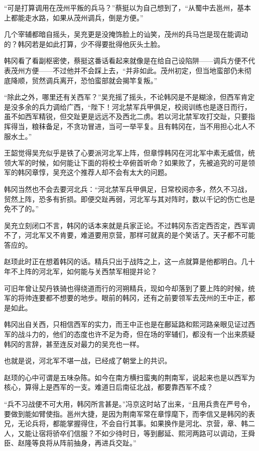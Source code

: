 “可是打算调用在茂州平叛的兵马？”蔡挺以为自己想到了，“从蜀中去邕州，基本上都能走水路，如果从茂州调兵，倒是方便。”

几个宰辅都暗自摇头，吴充更是没掩饰脸上的讪笑，茂州的兵马岂是现在能调动的？韩冈若是如此打算，少不得要批得他灰头土脸。

韩冈看了看副枢密使，蔡挺这番话看起来就像是在给自己设陷阱——调兵方便不代表茂州方便——不过他并不会踩上去，“并非如此。茂州初定，但当地蛮部仍未彻底降顺，贸然调兵离开，恐怕蛮部就会揭竿复叛。”

“除此之外，哪里还有关西军？”吴充摇了摇头，不论韩冈是不是糊涂，但西军肯定是没多余的兵力调给广西，“陛下！河北禁军兵甲俱足，校阅训练也是逐日而行，虽不如西军精锐，但交趾更是远远不及西北二虏。若以河北禁军攻打交趾，只要指挥得当，粮秣备足，不贪功冒进，当可一举平复。且有韩冈在，当不用担心北人不服水土。”

王韶觉得吴充似乎是铁了心要派河北军上阵，但章惇韩冈在河北军中素无威信，统领大军的时候，如何能让下面的将校士卒俯首听命？如果败了，先被追究的可是领军的韩冈章惇，吴充这个推荐人却不会有太大的问题。

韩冈当然也不会去要河北兵：“河北禁军兵甲俱足，日常校阅亦多，然久不习战，贸然上阵，恐多有折损。即便交趾再弱，河北军与其对阵时，数以千记的伤亡也是免不了的。”

吴充立刻闭口不言，韩冈的话本来就是兵家正论。不过韩冈东否定西否定，西军调不了，河北军又不肯要，难道要用京营，那样可就真的是个笑话了。天子都不可能答应的。

赵顼此时正在想着韩冈的话。精兵只出于战阵之上，这一点就算是他都明白。几十年不上阵的河北军，如何能与关西禁军相提并论？

可旧年曾让契丹铁骑也得绕道而行的河朔精兵，现如今却落到了要上阵的时候，统军的将帅连要都不想要的地步。眼前的韩冈，还有之前要领军去茂州的王中正，都是如此。

韩冈出自关西，只相信西军的实力，而王中正也是在鄜延路和熙河路亲眼见证过西军的战斗力的，他们的态度也许不足为奇，但在场的宰辅们，都没有一个出来质疑韩冈的言辞，甚至连反对最力的吴充也一样。

也就是说，河北军不堪一战，已经成了朝堂上的共识。

赵顼的心中可谓是五味杂陈。如今在南方横扫蛮夷的荆南军，说起来也是以西军为核心，算得上是西军的一支。难道日后南征北战，都要靠西军不成？

“兵不习战便不可大用，韩冈所言甚是。”冯京这时站了出来，“且用兵贵在严号令，要做到能如臂使指。邕州大捷，是因为荆南军常在章惇麾下，而李信又是韩冈的表兄，无论兵将，都能掌握得住，不会自行其事。如果换作是河北、京营，章、韩二人，又能让宿将骄卒们信服？不如少待时日，等到鄜延、熙河两路可以调动，王舜臣、赵隆等良将从阵前抽身，再进兵交趾。”

